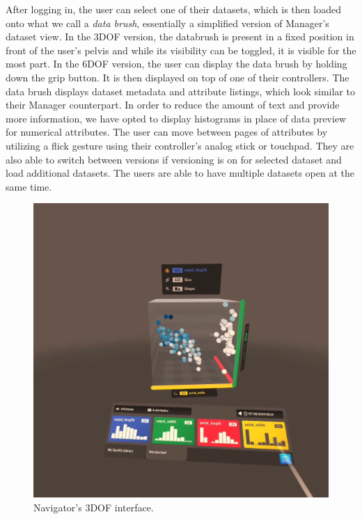 \documentclass{article}
\begin{document}
After logging in, the user can select one of their datasets, which is then loaded onto what we call a \emph{data brush}, essentially a simplified version of Manager's dataset view. In the 3DOF version, the databrush is present in a fixed position in front of the user's pelvis and while its visibility can be toggled, it is visible for the most part. In the 6DOF version, the user can display the data brush by holding down the grip button. It is then displayed on top of one of their controllers. The data brush displays dataset metadata and attribute listings, which look similar to their Manager counterpart. In order to reduce the amount of text and provide more information, we have opted to display histograms in place of data preview for numerical attributes. The user can move between pages of attributes by utilizing a flick gesture using their controller's analog stick or touchpad. They are also able to switch between versions if versioning is on for selected dataset and load additional datasets. The users are able to have multiple datasets open at the same time.\\

\begin{figure}[!h]
\centering
\includegraphics[scale=0.25]{images/cyberplot_3dof.png}
\caption{Navigator's 3DOF interface.}
\label{fig:navigator3dof}
\end{figure}
\end{document}
